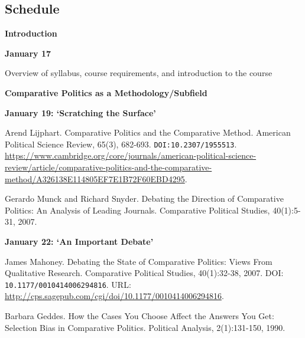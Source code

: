 \documentclass[letterpaper]{article}
\renewenvironment{itemize}{
  \begin{list}{}{
    \setlength{\leftmargin}{1.5em}
  }
}{
  \end{list}
}
\begin{document}
\subsection*{Schedule}

\begin{enumerate}

\item[] {\bf Introduction}
	\begin{itemize}
		\item {\bf January 17}
			\begin{itemize}
				\item[$\bullet$] Overview of syllabus, course requirements, and introduction to the course
			\end{itemize}
	\end{itemize}


\item {\bf Comparative Politics as a Methodology/Subfield}
	\begin{itemize}
		\item {\bf January 19: `Scratching the Surface'}
		\begin{itemize}
			\item[$\bullet$] Arend Lijphart. Comparative Politics and the Comparative Method. American Political Science Review, 65(3), 682-693. \texttt{DOI:10.2307/1955513}. \url{https://www.cambridge.org/core/journals/american-political-science-review/article/comparative-politics-and-the-comparative-method/A326138E114805EF7E1B72F60EBD4295}.
			\item[$\bullet$] Gerardo Munck and Richard Snyder. Debating the Direction of Comparative Politics: An Analysis of Leading Journals. Comparative Political Studies, 40(1):5-31, 2007.
		\end{itemize}
		
		\item {\bf January 22: `An Important Debate'}
			\begin{itemize}
				\item[$\bullet$] James Mahoney. Debating the State of Comparative Politics: Views From Qualitative Research. Comparative Political Studies, 40(1):32-38, 2007. DOI: \texttt{10.1177/0010414006294816}. URL: \url{http://cps.sagepub.com/cgi/doi/10.1177/0010414006294816}.
				\item[$\bullet$] Barbara Geddes. How the Cases You Choose Affect the Answers You Get: Selection Bias in Comparative Politics. Political Analysis, 2(1):131-150, 1990.
			\end{itemize}


\end{itemize}
\end{enumerate}
\end{document}
